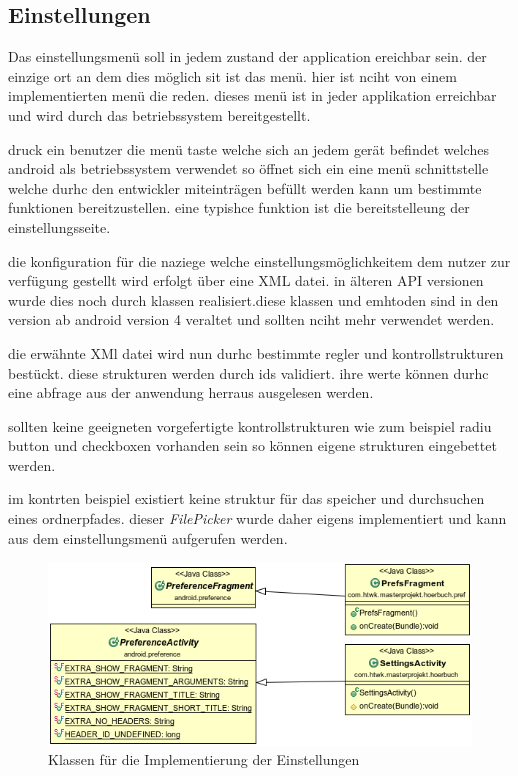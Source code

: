 \subsection{Einstellungen}
Das einstellungsmenü soll in jedem zustand der application ereichbar sein. der einzige ort an dem dies möglich sit ist das menü. hier ist nciht von einem implementierten menü die reden. dieses menü ist in jeder applikation erreichbar und wird durch das betriebssystem bereitgestellt.

druck ein benutzer die menü taste welche sich an jedem gerät befindet welches android als betriebssystem verwendet so öffnet sich ein eine menü schnittstelle welche durhc den entwickler miteinträgen befüllt werden kann um bestimmte funktionen bereitzustellen. eine typishce funktion ist die bereitstelleung der einstellungsseite.

die konfiguration für die naziege welche einstellungsmöglichkeitem dem nutzer zur verfügung gestellt wird erfolgt über eine XML datei. in älteren API versionen wurde dies noch durch klassen realisiert.diese klassen und emhtoden sind in den version ab android version 4 veraltet und sollten nciht mehr verwendet werden.

die erwähnte XMl datei wird nun durhc bestimmte regler und kontrollstrukturen bestückt. diese strukturen werden durch ids validiert. ihre werte können durhc eine abfrage aus der anwendung herraus ausgelesen werden.

sollten keine geeigneten vorgefertigte kontrollstrukturen wie zum beispiel radiu button und checkboxen vorhanden sein so können eigene strukturen eingebettet werden.

im kontrten beispiel existiert keine struktur für das speicher und durchsuchen  eines ordnerpfades. dieser \textit{FilePicker} wurde daher eigens implementiert und kann aus dem einstellungsmenü aufgerufen werden.

\begin{center}
\begin{figure}
\includegraphics[scale=0.7]{images/settings}
\caption{Klassen für die Implementierung der Einstellungen}
\label{settings}
\end{figure}
\end{center}

